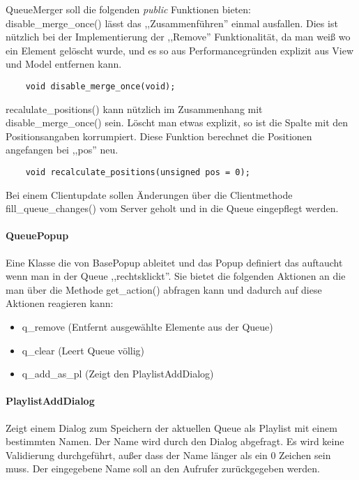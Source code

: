 QueueMerger soll die folgenden \textit{public} Funktionen bieten:
\\
disable\_merge\_once() lässt das ,,Zusammenführen'' einmal ausfallen. Dies ist nützlich bei der Implementierung der ,,Remove'' Funktionalität,
da man weiß wo ein Element gelöscht wurde, und es so aus Performancegründen explizit aus View und Model entfernen kann.
\begin{verbatim}  
    void disable_merge_once(void);
\end{verbatim}
recalulate\_positions() kann nützlich im Zusammenhang mit disable\_merge\_once() sein. Löscht man etwas explizit, so ist die Spalte mit den Positionsangaben korrumpiert. Diese Funktion berechnet die Positionen angefangen bei ,,pos'' neu.
\begin{verbatim}        
    void recalculate_positions(unsigned pos = 0);
\end{verbatim}    

Bei einem Clientupdate sollen Änderungen über die Clientmethode fill\_queue\_changes() vom Server geholt und in die Queue eingepflegt werden. 


\paragraph{QueuePopup}
Eine Klasse die von BasePopup ableitet und das Popup definiert das auftaucht wenn man in der Queue ,,rechtsklickt''.
Sie bietet die folgenden Aktionen an die man über die Methode get\_action() abfragen kann und dadurch auf diese Aktionen reagieren kann:
\begin{itemize}
\item q\_remove (Entfernt ausgewählte Elemente aus der Queue)
\item q\_clear (Leert Queue völlig)
\item q\_add\_as\_pl (Zeigt den PlaylistAddDialog)
\end{itemize}

\paragraph{PlaylistAddDialog}
Zeigt einem Dialog zum Speichern der aktuellen Queue als Playlist mit einem bestimmten Namen. Der Name wird durch den Dialog abgefragt.
Es wird keine Validierung durchgeführt, außer dass der Name länger als ein 0 Zeichen sein muss. Der eingegebene Name soll an den Aufrufer zurückgegeben werden.


